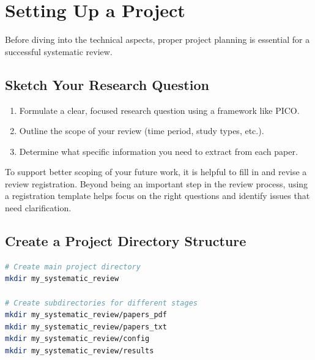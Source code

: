 \section{Setting Up a Project}

Before diving into the technical aspects, proper project planning is essential for a successful systematic review.

\subsection{Sketch Your Research Question}

\begin{enumerate}
    \item Formulate a clear, focused research question using a framework like PICO.
    \item Outline the scope of your review (time period, study types, etc.).
    \item Determine what specific information you need to extract from each paper.
\end{enumerate}

To support better scoping of your future work, it is helpful to fill in and revise a review registration. Beyond being an important step in the review process, using a registration template helps focus on the right questions and identify issues that need clarification.

\subsection{Create a Project Directory Structure}

\begin{commandbox}
\begin{lstlisting}[language=Bash]
# Create main project directory
mkdir my_systematic_review

# Create subdirectories for different stages
mkdir my_systematic_review/papers_pdf
mkdir my_systematic_review/papers_txt
mkdir my_systematic_review/config
mkdir my_systematic_review/results
\end{lstlisting}
\end{commandbox}

